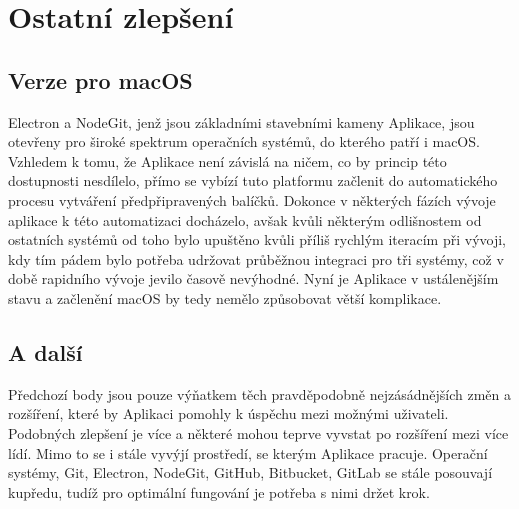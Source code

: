 \section{Ostatní zlepšení}

\subsection{Verze pro macOS}

Electron a NodeGit, jenž jsou základními stavebními kameny Aplikace, jsou otevřeny pro široké spektrum operačních systémů, do kterého patří i macOS. Vzhledem k tomu, že Aplikace není závislá na ničem, co by princip této dostupnosti nesdílelo, přímo se vybízí tuto platformu začlenit do automatického procesu vytváření předpřipravených balíčků. Dokonce v některých fázích vývoje aplikace k této automatizaci docházelo, avšak kvůli některým odlišnostem od ostatních systémů od toho bylo upuštěno kvůli příliš rychlým iteracím při vývoji, kdy tím pádem bylo potřeba udržovat průběžnou integraci pro tři systémy, což v době rapidního vývoje jevilo časově nevýhodné. Nyní je Aplikace v ustálenějším stavu a začlenění macOS by tedy nemělo způsobovat větší komplikace.

\subsection{A další}

Předchozí body jsou pouze výňatkem těch pravděpodobně nejzásádnějších změn a rozšíření, které by Aplikaci pomohly k úspěchu mezi možnými uživateli. Podobných zlepšení je více a některé mohou teprve vyvstat po rozšíření mezi více lídí. Mimo to se i stále vyvýjí prostředí, se kterým Aplikace pracuje. Operační systémy, Git, Electron, NodeGit, GitHub, Bitbucket, GitLab se stále posouvají kupředu, tudíž pro optimální fungování je potřeba s nimi držet krok.